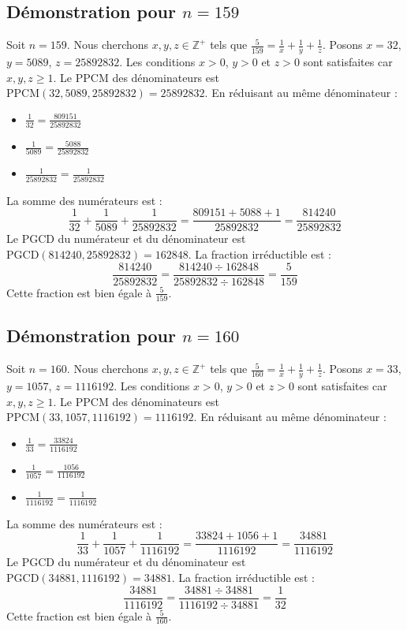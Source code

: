 \documentclass[11pt,a4paper]{article}
\begin{document}
\subsection{Démonstration pour $n = 159$}
Soit $n = 159$. Nous cherchons $x, y, z \in \mathbb{Z}^{+}$ tels que $\frac{5}{159} = \frac{1}{x} + \frac{1}{y} + \frac{1}{z}$.
Posons $x = 32$, $y = 5089$, $z = 25892832$.
Les conditions $x > 0$, $y > 0$ et $z > 0$ sont satisfaites car $x, y, z \geq 1$.
Le PPCM des dénominateurs est $\text{PPCM}(32, 5089, 25892832) = 25892832$.
En réduisant au même dénominateur :
\begin{itemize}
    \item $\frac{1}{32} = \frac{809151}{25892832}$
    \item $\frac{1}{5089} = \frac{5088}{25892832}$
    \item $\frac{1}{25892832} = \frac{1}{25892832}$
\end{itemize}
La somme des numérateurs est :
$$ \frac{1}{32} + \frac{1}{5089} + \frac{1}{25892832} = \frac{809151 + 5088 + 1}{25892832} = \frac{814240}{25892832} $$
Le PGCD du numérateur et du dénominateur est $\text{PGCD}(814240, 25892832) = 162848$.
La fraction irréductible est :
$$ \frac{814240}{25892832} = \frac{814240 \div 162848}{25892832 \div 162848} = \frac{5}{159} $$
Cette fraction est bien égale à $\frac{5}{159}$.

\subsection{Démonstration pour $n = 160$}
Soit $n = 160$. Nous cherchons $x, y, z \in \mathbb{Z}^{+}$ tels que $\frac{5}{160} = \frac{1}{x} + \frac{1}{y} + \frac{1}{z}$.
Posons $x = 33$, $y = 1057$, $z = 1116192$.
Les conditions $x > 0$, $y > 0$ et $z > 0$ sont satisfaites car $x, y, z \geq 1$.
Le PPCM des dénominateurs est $\text{PPCM}(33, 1057, 1116192) = 1116192$.
En réduisant au même dénominateur :
\begin{itemize}
    \item $\frac{1}{33} = \frac{33824}{1116192}$
    \item $\frac{1}{1057} = \frac{1056}{1116192}$
    \item $\frac{1}{1116192} = \frac{1}{1116192}$
\end{itemize}
La somme des numérateurs est :
$$ \frac{1}{33} + \frac{1}{1057} + \frac{1}{1116192} = \frac{33824 + 1056 + 1}{1116192} = \frac{34881}{1116192} $$
Le PGCD du numérateur et du dénominateur est $\text{PGCD}(34881, 1116192) = 34881$.
La fraction irréductible est :
$$ \frac{34881}{1116192} = \frac{34881 \div 34881}{1116192 \div 34881} = \frac{1}{32} $$
Cette fraction est bien égale à $\frac{5}{160}$.
\end{document}

